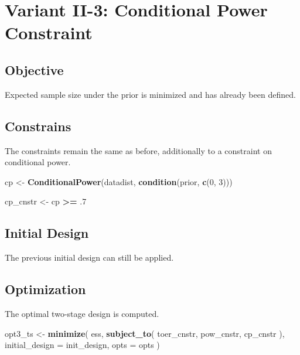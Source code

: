 \documentclass[]{book}
\newenvironment{Shaded}{\begin{snugshade}}{\end{snugshade}}
\newcommand{\DataTypeTok}[1]{\textcolor[rgb]{0.13,0.29,0.53}{#1}}
\newcommand{\DecValTok}[1]{\textcolor[rgb]{0.00,0.00,0.81}{#1}}
\newcommand{\FloatTok}[1]{\textcolor[rgb]{0.00,0.00,0.81}{#1}}
\newcommand{\KeywordTok}[1]{\textcolor[rgb]{0.13,0.29,0.53}{\textbf{#1}}}
\newcommand{\NormalTok}[1]{#1}
\newcommand{\OperatorTok}[1]{\textcolor[rgb]{0.81,0.36,0.00}{\textbf{#1}}}
\newcommand{\StringTok}[1]{\textcolor[rgb]{0.31,0.60,0.02}{#1}}
\begin{document}
\hypertarget{variantII_3}{%
\section{Variant II-3: Conditional Power Constraint}\label{variantII_3}}

\hypertarget{objective-5}{%
\subsection{Objective}\label{objective-5}}

Expected sample size under the prior is minimized and has already been defined.

\hypertarget{constrains-5}{%
\subsection{Constrains}\label{constrains-5}}

The constraints remain the same as before, additionally to a constraint
on conditional power.

\begin{Shaded}
\begin{Highlighting}[]
\NormalTok{cp <-}\StringTok{ }\KeywordTok{ConditionalPower}\NormalTok{(datadist, }\KeywordTok{condition}\NormalTok{(prior, }\KeywordTok{c}\NormalTok{(}\DecValTok{0}\NormalTok{, }\DecValTok{3}\NormalTok{)))}

\NormalTok{cp_cnstr <-}\StringTok{ }\NormalTok{cp }\OperatorTok{>=}\StringTok{ }\FloatTok{.7}
\end{Highlighting}
\end{Shaded}

\hypertarget{initial-design-4}{%
\subsection{Initial Design}\label{initial-design-4}}

The previous initial design can still be applied.

\hypertarget{optimization-5}{%
\subsection{Optimization}\label{optimization-5}}

The optimal two-stage design is computed.

\begin{Shaded}
\begin{Highlighting}[]
\NormalTok{opt3_ts <-}\StringTok{ }\KeywordTok{minimize}\NormalTok{(}
\NormalTok{        ess,}
        \KeywordTok{subject_to}\NormalTok{(}
\NormalTok{            toer_cnstr,}
\NormalTok{            pow_cnstr,}
\NormalTok{            cp_cnstr}
\NormalTok{        ),}
        \DataTypeTok{initial_design =}\NormalTok{ init_design,}
        \DataTypeTok{opts =}\NormalTok{ opts}
\NormalTok{)}
\end{Highlighting}
\end{Shaded}
\end{document}
